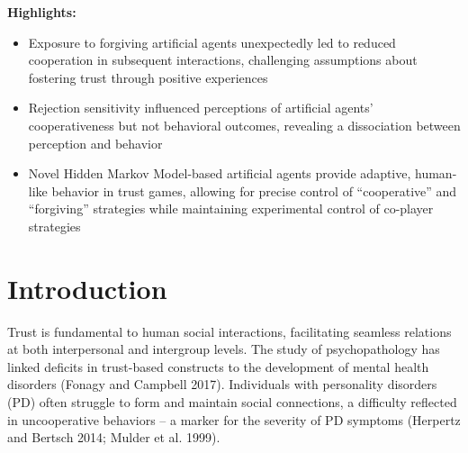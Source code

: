 \documentclass[
]{article}
\begin{document}
\vspace{1cm}

\textbf{Highlights:}

\begin{itemize}
\item
  Exposure to forgiving artificial agents unexpectedly led to reduced cooperation in subsequent interactions, challenging assumptions about fostering trust through positive experiences
\item
  Rejection sensitivity influenced perceptions of artificial agents' cooperativeness but not behavioral outcomes, revealing a dissociation between perception and behavior
\item
  Novel Hidden Markov Model-based artificial agents provide adaptive, human-like behavior in trust games, allowing for precise control of ``cooperative'' and ``forgiving'' strategies while maintaining experimental control of co-player strategies
\end{itemize}

\pagebreak

\section{Introduction}\label{introduction}

Trust is fundamental to human social interactions, facilitating seamless relations at both interpersonal and intergroup levels. The study of psychopathology has linked deficits in trust-based constructs to the development of mental health disorders (Fonagy and Campbell 2017). Individuals with personality disorders (PD) often struggle to form and maintain social connections, a difficulty reflected in uncooperative behaviors -- a marker for the severity of PD symptoms (Herpertz and Bertsch 2014; Mulder et al. 1999).
\end{document}

